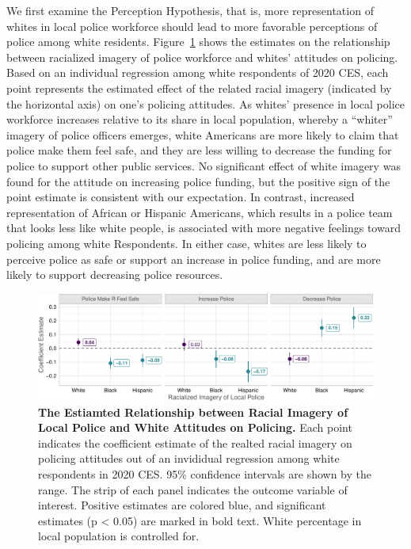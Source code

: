 \documentclass[
  12pt,
]{article}
\begin{document}
We first examine the Perception Hypothesis, that is, more representation
of whites in local police workforce should lead to more favorable
perceptions of police among white residents. Figure~\ref{fig-baseline}
shows the estimates on the relationship between racialized imagery of
police workforce and whites' attitudes on policing. Based on an
individual regression among white respondents of 2020 CES, each point
represents the estimated effect of the related racial imagery (indicated
by the horizontal axis) on one's policing attitudes. As whites' presence
in local police workforce increases relative to its share in local
population, whereby a ``whiter'' imagery of police officers emerges,
white Americans are more likely to claim that police make them feel
safe, and they are less willing to decrease the funding for police to
support other public services. No significant effect of white imagery
was found for the attitude on increasing police funding, but the
positive sign of the point estimate is consistent with our expectation.
In contrast, increased representation of African or Hispanic Americans,
which results in a police team that looks less like white people, is
associated with more negative feelings toward policing among white
Respondents. In either case, whites are less likely to perceive police
as safe or support an increase in police funding, and are more likely to
support decreasing police resources.

\begin{figure}[tb]

{\centering \includegraphics{racialized-police_files/figure-pdf/fig-baseline-1.pdf}

}

\caption{\label{fig-baseline}\textbf{The Estiamted Relationship between
Racial Imagery of Local Police and White Attitudes on Policing.} Each
point indicates the coefficient estimate of the realted racial imagery
on policing attitudes out of an invididual regression among white
respondents in 2020 CES. 95\% confidence intervals are shown by the
range. The strip of each panel indicates the outcome variable of
interest. Positive estimates are colored blue, and significant estimates
(p \textless{} 0.05) are marked in bold text. White percentage in local
population is controlled for.}

\end{figure}
\end{document}

